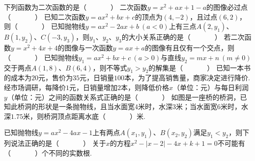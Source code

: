 \documentclass[10pt]{article}
\begin{document}
\showsecret
{}
\informationline
\begin{questions}{\selectingintroduction}
    \question 下列函数为二次函数的是（~~~~~~~）
    \question 二次函数$y = x^{2} + ax + 1 - a$的图像必过点（~~~~~~~）
    \question 已知二次函数$y = ax^{2} + bx + c$的顶点为$(4, - 2)$，且过点$(6,2)$，则（~~~~~~~）
    \question 已知抛物线$y=ax^2-2ax+b \ (a < 0)$上有三点$A(2,y_1)$、$B(1,y_2)$、$C(-3,y_3)$，则$y_1$、$y_2$、$y_3$的大小关系正确的是（~~~~~~~）
    \question 若二次函数$y = x^{2} + 4x + 4$的图像与一次函数$y = ax + a$的图像有且仅有一个交点，则（~~~~~~~）
    \question 已知抛物线$y_1=ax^2+bx+c \ (a > 0)$与直线$y_2=mx+n \ (m \neq 0)$交于两点$A(1,8)$、$B(6,4)$，则不等式$y_1>y_2$的解集是（~~~~~~~）
    \question 已知一本书的成本为$20$元，售价为$35$元，日销量$100$本，为了提高销售量，商家决定进行降价.经市场调研，每降价$1$元，日销量增加$2$本，则降低价格$x$（单位：元）与每日利润$y$（单位：元）之间的函数关系式正确的是（~~~~~~~）
    \question 如图是一座桥的桥洞，已知此桥洞的形状是一条抛物线，且当水面宽$4$米时，水深$3$米；当水面宽$6$米时，水深$1.75$米，则桥洞顶点距离水底（~~~~~~~）米.
    \begin{figure}[!htb]
        \raggedleft
    \end{figure}
    \question 已知抛物线$y=ax^2-4ax-1$上有两点$A(x_1,y_1)$、$B(x_2,y_2)$满足$y_1<y_2$，则下列说法正确的是（~~~~~~~）
    \question 关于$x$的方程$x^2-\left|x-2\right|-4x+k+1=0$不可能有（~~~~~~~）个不同的实数根.
\end{questions}
\end{document}

